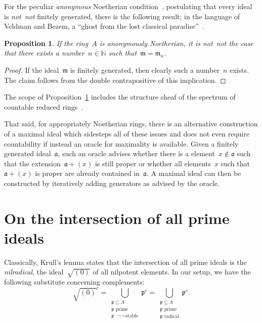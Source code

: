\documentclass[com,11pt,crcready]{iosart2x}
\theoremstyle{definition}
\theoremstyle{plain}
\newtheorem{proposition}[definition]{Proposition}
\theoremstyle{remark}
\newcommand{\aaa}{\mathfrak{a}}
\newcommand{\mmm}{\mathfrak{m}}
\newcommand{\ppp}{\mathfrak{p}}
\newcommand{\NN}{\mathbb{N}}
\renewcommand{\_}{\mathpunct{.}\,}
\begin{document}
For the peculiar \emph{anonymous} Noetherian condition~\cite[Definition~3.27]{blechschmidt:phd}, postulating that every
ideal is \emph{not~not} finitely generated, there is the following result;
in the language of Veldman and Bezem, a ``ghost from the lost classical
paradise''~\cite[Section~5.1]{veldman-bezem:ramsey}.

\begin{proposition}\label{prop:fin-anon}If the ring~$A$ is anonymously
Noetherian, it is \emph{not~not} the case that there exists a number~$n \in
\NN$ such that~$\mmm = \mmm_n$.\end{proposition}

\begin{proof}If the ideal~$\mmm$ is finitely generated, then clearly such a
number~$n$ exists. The claim follows from the double contrapositive of this
implication.
\end{proof}

The scope of Proposition~\ref{prop:fin-anon} includes the structure sheaf of
the spectrum of countable reduced
rings~\cite[Proposition~34]{blechschmidt:generalized-spaces}.

That said, for appropriately Noetherian rings, there is an alternative
construction of a maximal ideal which sidesteps all of these issues and does
not even require countability if instead an oracle for maximality is available.
Given a finitely generated ideal~$\aaa$, such an oracle advises whether there is a
element~$x \not\in \aaa$ such that the extension~$\aaa + (x)$ is still proper
or whether all elements~$x$ such that~$\aaa + (x)$ is proper are already
contained in~$\aaa$. A maximal ideal can then be constructed by iteratively
adding generators as advised by the oracle.~\cite{XXX}


\section{On the intersection of all prime ideals}
\label{sect:krull}

Classically, Krull's lemma states that the intersection of all prime ideals is the
\emph{nilradical}, the ideal~$\sqrt{(0)}$ of all nilpotent elements. In our
setup, we have the following substitute concerning complements:
\[ \sqrt{(0)}^c =
  \bigcup_{\substack{\text{$\ppp \subseteq A$}\\\text{$\ppp$ prime}\\\text{$\ppp$ $\neg\neg$-stable}}} \ppp^c =
  \bigcup_{\substack{\text{$\ppp \subseteq A$}\\\text{$\ppp$ prime}\\\text{$\ppp$ radical}}} \ppp^c. \]
\end{document}
